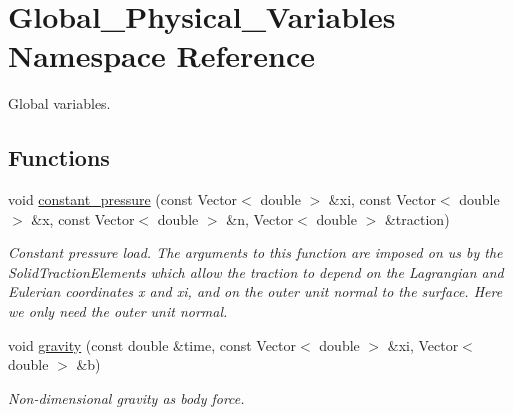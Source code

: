 \hypertarget{namespaceGlobal__Physical__Variables}{}\section{Global\+\_\+\+Physical\+\_\+\+Variables Namespace Reference}
\label{namespaceGlobal__Physical__Variables}


Global variables.  


\subsection*{Functions}
\begin{DoxyCompactItemize}
\item 
void \hyperlink{namespaceGlobal__Physical__Variables_a19f4e20a92e7d216b4d2b00308f96917}{constant\+\_\+pressure} (const Vector$<$ double $>$ \&xi, const Vector$<$ double $>$ \&x, const Vector$<$ double $>$ \&n, Vector$<$ double $>$ \&traction)
\begin{DoxyCompactList}\small\item\em Constant pressure load. The arguments to this function are imposed on us by the Solid\+Traction\+Elements which allow the traction to depend on the Lagrangian and Eulerian coordinates x and xi, and on the outer unit normal to the surface. Here we only need the outer unit normal. \end{DoxyCompactList}\item 
void \hyperlink{namespaceGlobal__Physical__Variables_a0777aef63372db7f91ad894c38159681}{gravity} (const double \&time, const Vector$<$ double $>$ \&xi, Vector$<$ double $>$ \&b)
\begin{DoxyCompactList}\small\item\em Non-\/dimensional gravity as body force. \end{DoxyCompactList}\end{DoxyCompactItemize}
